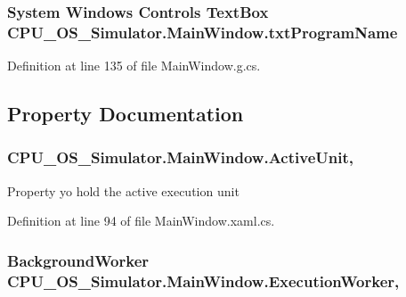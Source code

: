 \subsubsection[{txt\+Program\+Name}]{\setlength{\rightskip}{0pt plus 5cm}System Windows Controls Text\+Box C\+P\+U\+\_\+\+O\+S\+\_\+\+Simulator.\+Main\+Window.\+txt\+Program\+Name\hspace{0.3cm}{\ttfamily [package]}}\label{class_c_p_u___o_s___simulator_1_1_main_window_a2c64b45db8c1d7a30c2f9155899cf918}


Definition at line 135 of file Main\+Window.\+g.\+cs.



\subsection{Property Documentation}
\hypertarget{class_c_p_u___o_s___simulator_1_1_main_window_a3d03550a73d7ab18ebd143a38dbf1431}{}
\subsubsection[{Active\+Unit}]{ C\+P\+U\+\_\+\+O\+S\+\_\+\+Simulator.\+Main\+Window.\+Active\+Unit\hspace{0.3cm}{\ttfamily [get]}, {\ttfamily [set]}}\label{class_c_p_u___o_s___simulator_1_1_main_window_a3d03550a73d7ab18ebd143a38dbf1431}


Property yo hold the active execution unit 



Definition at line 94 of file Main\+Window.\+xaml.\+cs.

\hypertarget{class_c_p_u___o_s___simulator_1_1_main_window_aab5d6c95426ebe1e75b7c3bfc0488b84}{}
\subsubsection[{Execution\+Worker}]{\setlength{\rightskip}{0pt plus 5cm}Background\+Worker C\+P\+U\+\_\+\+O\+S\+\_\+\+Simulator.\+Main\+Window.\+Execution\+Worker\hspace{0.3cm}{\ttfamily [get]}, {\ttfamily [set]}}\label{class_c_p_u___o_s___simulator_1_1_main_window_aab5d6c95426ebe1e75b7c3bfc0488b84}


